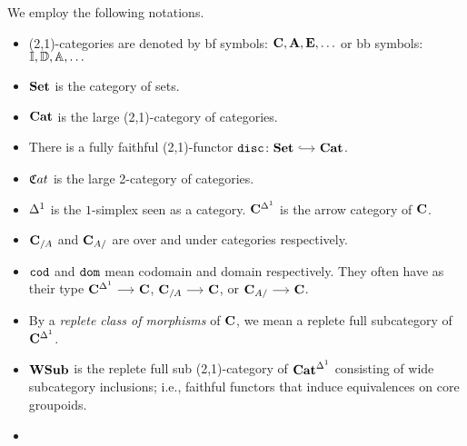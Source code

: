 \documentclass[a4paper,dvipsnames, 11pt]{amsart}
\begin{document}
\maketitle
\cite{Cis19}
\begin{notation}
	We employ the following notations.
	\begin{itemize}
		\item %
			(2,1)-categories are denoted by bf symbols:
			$\mathbf{C},\mathbf{A},\mathbf{E},\ldots$
			or bb symbols:
			$\mathbb{I},\mathbb{D},\mathbb{A},\ldots$
		\item %
			$\mathbf{Set}$ is the category of sets.
		\item %
			${\mathbf{Cat}}$ is the large (2,1)-category of categories.
		\item %
			There is a fully faithful (2,1)-functor $\disc\colon\Set\arr[hook]\Cat$.
		\item %
			${{\mathfrak{C}}{at}}$ is the large 2-category of categories.
		\item %
			${\Delta^1}$ is the $1$-simplex seen as a category.
			$\mathbf{C}^{\Delta^1}$ is the arrow category of $\mathbf{C}$.
		\item %
			$\mathbf{C}_{/A}$ and $\mathbf{C}_{A/}$ are over and under categories respectively.
		\item %
			$\mathtt{cod}$ and $\mathtt{dom}$ mean codomain and domain respectively. They often have as their type
			$\C^\ra\arr\C$, $\C_{/A}\arr\C$,
			or $\C_{A/}\arr\C$.
		\item %
			By a \emph{replete class of morphisms} of $\mathbf{C}$, we mean a replete full subcategory of $\mathbf{C}^{\Delta^1}$.
		\item %
			$\mathbf{WSub}$ is the replete full sub (2,1)-category of ${\mathbf{Cat}}^{\Delta^1}$
			consisting of wide subcategory inclusions; i.e., faithful functors that induce equivalences on core groupoids.
		\item %
		\qedhere %
	\end{itemize}
\end{notation}
\end{document}
